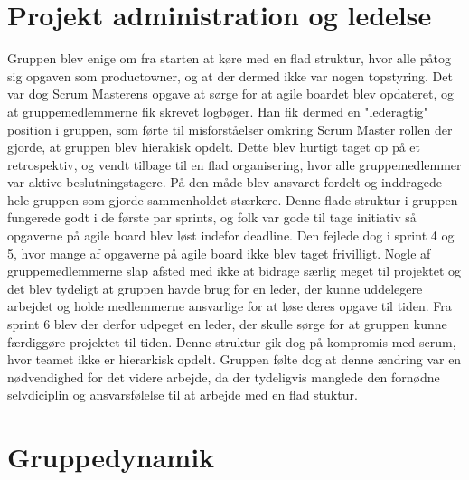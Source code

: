 \section{Projekt administration og ledelse}
Gruppen blev enige om fra starten at køre med en flad struktur, hvor alle påtog sig opgaven som productowner, og at der dermed ikke var nogen topstyring.  
Det var dog Scrum Masterens opgave at sørge for at agile boardet blev opdateret, og at gruppemedlemmerne fik skrevet logbøger. Han fik dermed en "lederagtig"
position i gruppen, som førte til misforståelser omkring Scrum Master rollen der gjorde, at gruppen blev hierakisk opdelt. Dette blev hurtigt taget op på et 
retrospektiv, og vendt tilbage til en flad organisering, hvor alle gruppemedlemmer var aktive beslutningstagere. På den måde blev ansvaret fordelt og inddragede hele gruppen 
som gjorde sammenholdet stærkere. Denne flade struktur i gruppen fungerede godt i de første par sprints, og folk var gode til tage initiativ så opgaverne på
agile board blev løst indefor deadline. Den fejlede dog i sprint 4 og 5, hvor mange af opgaverne på agile board ikke blev taget frivilligt. Nogle af gruppemedlemmerne
slap afsted med ikke at bidrage særlig meget til projektet og det blev tydeligt at gruppen havde brug for en leder, der kunne uddelegere arbejdet
og holde medlemmerne ansvarlige for at løse deres opgave til tiden. Fra sprint 6 blev der derfor udpeget en leder, der skulle sørge for at gruppen kunne 
færdiggøre projektet til tiden. Denne struktur gik dog på kompromis med scrum, hvor teamet ikke er hierarkisk opdelt. Gruppen følte dog at denne ændring var en
nødvendighed for det videre arbejde, da der tydeligvis manglede den fornødne selvdiciplin og ansvarsfølelse til at arbejde med en flad stuktur.       
 

\section{Gruppedynamik}

